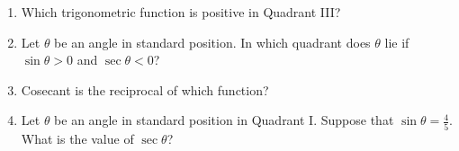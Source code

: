 \documentclass{article}
\begin{document}
\begin{enumerate}


\item Which trigonometric function is positive in Quadrant III?

  \begin{enumerate}
  \end{enumerate}
  
\item Let $\theta$ be an angle in standard position. In which quadrant does $\theta$ lie if $\sin\theta>0$ and $\sec\theta<0$?

  \begin{enumerate}
  \end{enumerate}


\item Cosecant is the reciprocal of which function?

  \begin{enumerate}
  \end{enumerate}

\item Let $\theta$ be an angle in standard position in Quadrant I. Suppose that $\sin\theta=\frac{4}{5}$. What is the value of $\sec\theta$?

  \begin{enumerate}
  \end{enumerate}


\end{enumerate}
\end{document}
